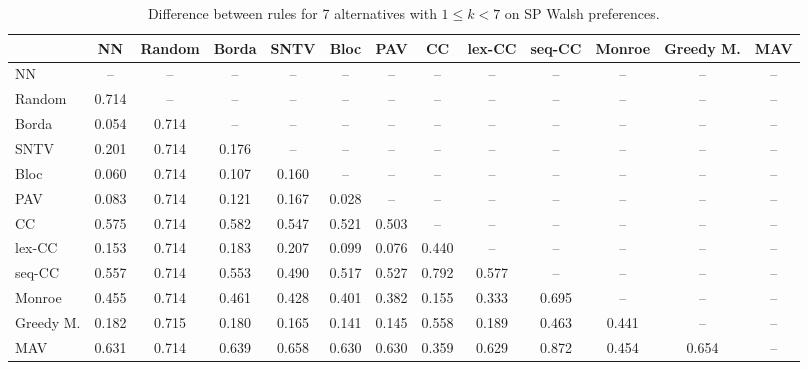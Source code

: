 
\begin{table*}[htbp]
\centering
\begin{tabular}{lcccccccccccc}
\toprule
 & NN & Random & Borda & SNTV & Bloc & PAV & CC & lex-CC & seq-CC & Monroe & Greedy M. & MAV \\
\midrule
NN & -- & -- & -- & -- & -- & -- & -- & -- & -- & -- & -- & -- \\
Random & \cellcolor{blue!71} 0.714 & -- & -- & -- & -- & -- & -- & -- & -- & -- & -- & -- \\
Borda & \cellcolor{blue!5} 0.054 & \cellcolor{blue!71} 0.714 & -- & -- & -- & -- & -- & -- & -- & -- & -- & -- \\
SNTV & \cellcolor{blue!20} 0.201 & \cellcolor{blue!71} 0.714 & \cellcolor{blue!17} 0.176 & -- & -- & -- & -- & -- & -- & -- & -- & -- \\
Bloc & \cellcolor{blue!6} 0.060 & \cellcolor{blue!71} 0.714 & \cellcolor{blue!10} 0.107 & \cellcolor{blue!16} 0.160 & -- & -- & -- & -- & -- & -- & -- & -- \\
PAV & \cellcolor{blue!8} 0.083 & \cellcolor{blue!71} 0.714 & \cellcolor{blue!12} 0.121 & \cellcolor{blue!16} 0.167 & \cellcolor{blue!2} 0.028 & -- & -- & -- & -- & -- & -- & -- \\
CC & \cellcolor{blue!57} 0.575 & \cellcolor{blue!71} 0.714 & \cellcolor{blue!58} 0.582 & \cellcolor{blue!54} 0.547 & \cellcolor{blue!52} 0.521 & \cellcolor{blue!50} 0.503 & -- & -- & -- & -- & -- & -- \\
lex-CC & \cellcolor{blue!15} 0.153 & \cellcolor{blue!71} 0.714 & \cellcolor{blue!18} 0.183 & \cellcolor{blue!20} 0.207 & \cellcolor{blue!9} 0.099 & \cellcolor{blue!7} 0.076 & \cellcolor{blue!44} 0.440 & -- & -- & -- & -- & -- \\
seq-CC & \cellcolor{blue!55} 0.557 & \cellcolor{blue!71} 0.714 & \cellcolor{blue!55} 0.553 & \cellcolor{blue!49} 0.490 & \cellcolor{blue!51} 0.517 & \cellcolor{blue!52} 0.527 & \cellcolor{blue!79} 0.792 & \cellcolor{blue!57} 0.577 & -- & -- & -- & -- \\
Monroe & \cellcolor{blue!45} 0.455 & \cellcolor{blue!71} 0.714 & \cellcolor{blue!46} 0.461 & \cellcolor{blue!42} 0.428 & \cellcolor{blue!40} 0.401 & \cellcolor{blue!38} 0.382 & \cellcolor{blue!15} 0.155 & \cellcolor{blue!33} 0.333 & \cellcolor{blue!69} 0.695 & -- & -- & -- \\
Greedy M. & \cellcolor{blue!18} 0.182 & \cellcolor{blue!71} 0.715 & \cellcolor{blue!18} 0.180 & \cellcolor{blue!16} 0.165 & \cellcolor{blue!14} 0.141 & \cellcolor{blue!14} 0.145 & \cellcolor{blue!55} 0.558 & \cellcolor{blue!18} 0.189 & \cellcolor{blue!46} 0.463 & \cellcolor{blue!44} 0.441 & -- & -- \\
MAV & \cellcolor{blue!63} 0.631 & \cellcolor{blue!71} 0.714 & \cellcolor{blue!63} 0.639 & \cellcolor{blue!65} 0.658 & \cellcolor{blue!63} 0.630 & \cellcolor{blue!63} 0.630 & \cellcolor{blue!35} 0.359 & \cellcolor{blue!62} 0.629 & \cellcolor{blue!87} 0.872 & \cellcolor{blue!45} 0.454 & \cellcolor{blue!65} 0.654 & -- \\
\bottomrule
\end{tabular}

\caption{Difference between rules for 7 alternatives with $1 \leq k < 7$ on SP Walsh preferences.}
\label{tab:rule_distance_heatmap-m=[7]-pref_dist=single_peaked_walsh}
\end{table*}
    